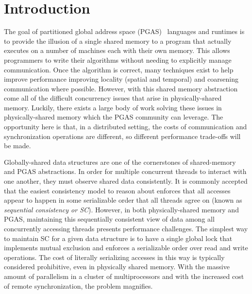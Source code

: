 \section{Introduction}

The goal of partitioned global address space (PGAS)~\cite{upc:2005} languages and runtimes is to provide the illusion of a single shared memory to a program that actually executes on a number of machines each with their own memory. This allows programmers to write their algorithms without needing to explicitly manage communication. Once the algorithm is correct, many techniques exist to help improve performance improving locality (spatial and temporal) and coarsening communication where possible. However, with this shared memory abstraction come all of the difficult concurrency issues that arise in physically-shared memory. Luckily, there exists a large body of work solving these issues in physically-shared memory which the PGAS community can leverage. The opportunity here is that, in a distributed setting, the costs of communication and synchronization operations are different, so different performance trade-offs will be made.

Globally-shared data structures are one of the cornerstones of shared-memory and PGAS abstractions. 
In order for multiple concurrent threads to interact with one another, they must observe shared data consistently. It is commonly accepted that the easiest consistency model to reason about enforces that all accesses appear to happen in some serializable order that all threads agree on (known as \emph{sequential consistency or SC}).
However, in both physically-shared memory and PGAS, maintaining this sequentially consistent view of data among all concurrently accessing threads presents performance challenges.
The simplest way to maintain SC for a given data structure is to have a single global lock that implements mutual exclusion and enforces a serializable order over read and write operations. The cost of literally serializing accesses in this way is typically considered prohibitive, even in physically shared memory.
With the massive amount of parallelism in a cluster of multiprocessors and with the increased cost of remote synchronization, the problem magnifies.

